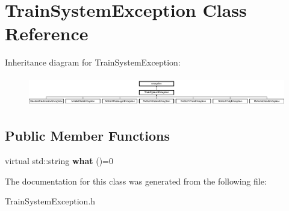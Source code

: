 \hypertarget{classTrainSystemException}{}\section{Train\+System\+Exception Class Reference}
\label{classTrainSystemException}
Inheritance diagram for Train\+System\+Exception\+:\begin{figure}[H]
\begin{center}
\leavevmode
\includegraphics[height=1.304348cm]{classTrainSystemException}
\end{center}
\end{figure}
\subsection*{Public Member Functions}
\begin{DoxyCompactItemize}
\item 
\mbox{\label{classTrainSystemException_a9f4952ed02d47ffa66abd0c9627a7975}} 
virtual std\+::string {\bfseries what} ()=0
\end{DoxyCompactItemize}


The documentation for this class was generated from the following file\+:\begin{DoxyCompactItemize}
\item 
Train\+System\+Exception.\+h\end{DoxyCompactItemize}

